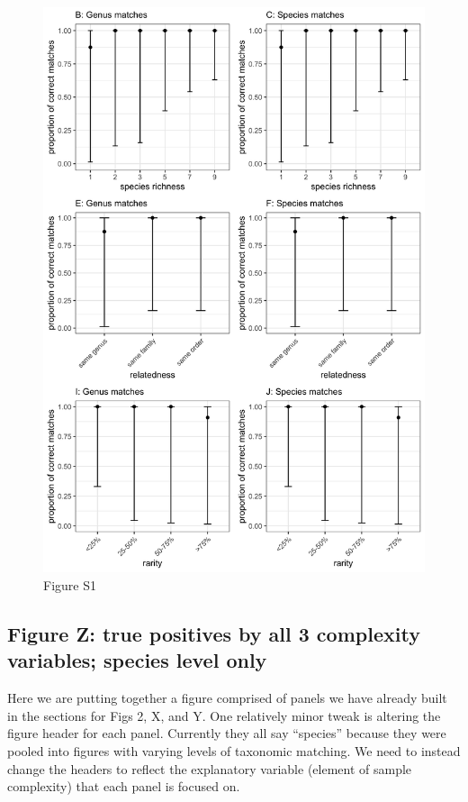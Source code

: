 \documentclass[
]{article}
\begin{document}
\begin{figure}
\centering
\includegraphics{figS1_combined.jpg}
\caption{Figure S1}
\end{figure}

\hypertarget{figure-z-true-positives-by-all-3-complexity-variables-species-level-only}{%
\subsection{Figure Z: true positives by all 3 complexity variables;
species level
only}\label{figure-z-true-positives-by-all-3-complexity-variables-species-level-only}}

Here we are putting together a figure comprised of panels we have
already built in the sections for Figs 2, X, and Y. One relatively minor
tweak is altering the figure header for each panel. Currently they all
say ``species'' because they were pooled into figures with varying
levels of taxonomic matching. We need to instead change the headers to
reflect the explanatory variable (element of sample complexity) that
each panel is focused on.
\end{document}
